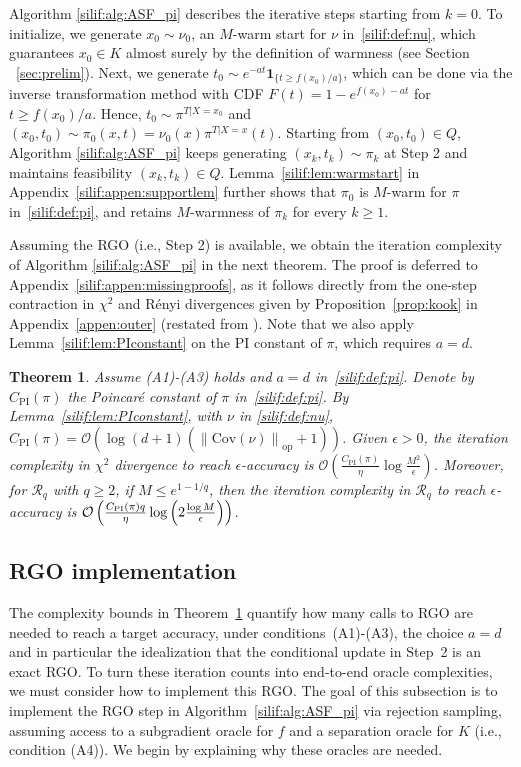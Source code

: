 \documentclass[11pt,letterpaper]{article}
\newcommand{\norm}[1]{\left\lVert #1 \right\rVert}
\newcommand{\cov}[1]{\mathrm{Cov}{\left( #1\right)}}
\newcommand{\opnorm}[1]{\norm{#1}_{\operatorname{op}}}
\newcommand{\brac}[1]{\left( #1\right)}
\newtheorem{theorem}[thm]{Theorem}
\begin{document}
Algorithm \ref{silif:alg:ASF_pi} describes the iterative steps starting from $k = 0$.
To initialize, we generate $x_0\sim \nu_0$, an $M$-warm start for $\nu$ in~\eqref{silif:def:nu}, which guarantees $x_0\in K$ almost surely by the definition of warmness (see Section ~\ref{sec:prelim}). Next, we generate $t_0\sim e^{-at}\mathbf{1}_{\{t\ge f(x_0)/a\}}$, which can be done via the inverse transformation method with CDF $F(t)=1-e^{f(x_0)-at}$ for $t\ge f(x_0)/a$. Hence, $t_0\sim \pi^{T| X=x_0}$ and $(x_0,t_0)\sim \pi_0(x,t) = \nu_0(x) \pi^{T| X=x}(t)$. 
Starting from $(x_0,t_0) \in Q$, Algorithm \ref{silif:alg:ASF_pi} keeps generating $(x_k,t_k)\sim \pi_k$ at Step 2 and maintains feasibility $(x_k,t_k) \in Q$.
Lemma~\ref{silif:lem:warmstart} in Appendix~\ref{silif:appen:supportlem} further shows that $\pi_0$ is $M$-warm for $\pi$ in~\eqref{silif:def:pi}, and retains $M$-warmness of $\pi_k$ for every $k\ge 1$.

Assuming the RGO (i.e., Step 2) is available, we obtain the iteration complexity of Algorithm \ref{silif:alg:ASF_pi} in the next theorem. The proof is  deferred to Appendix~\ref{silif:appen:missingproofs},
as it follows directly from the one-step contraction in $\chi^2$ and R\'enyi divergences given by Proposition~\ref{prop:kook} in Appendix~\ref{appen:outer} (restated from \cite[Lemma~2.9]{kook2025algodiffusion}).
Note that we also apply Lemma~\ref{silif:lem:PIconstant} on the PI constant of $\pi$, which requires $a=d$.


\begin{theorem}\label{silif:theo:outer}
Assume (A1)-(A3) holds and $a=d$ in~\eqref{silif:def:pi}. Denote by $C_{\mathrm{PI}}(\pi)$ the Poincar\'e constant of $\pi$ in~\eqref{silif:def:pi}. By Lemma~\ref{silif:lem:PIconstant}, with $\nu$ in \eqref{silif:def:nu},
$C_{\mathrm{PI}}(\pi)=  \mathcal{O}\brac{\log (d+1)\brac{\opnorm{\cov{\nu}}+1 }}$.
Given $\epsilon>0$, the iteration complexity in $\chi^2$ divergence to reach $\epsilon$-accuracy is
$\mathcal{O} \left(\frac{C_{\mathrm{PI}}(\pi)}{\eta}\log \frac{M^2}{\epsilon}\right)$.
Moreover, for $\mathcal{R}_q$ with $q\ge2$, if $M\le e^{ 1-1/q}$, then the iteration complexity in $\mathcal{R}_q$ to reach $\epsilon$-accuracy is
${\cal O} \left(\frac{C_{\mathrm{PI}}(\pi) q}{\eta}\log \left(2\frac{\log M}{\epsilon}\right)\right)$.
\end{theorem}

\subsection{RGO implementation}\label{subsec:RGO}
The complexity bounds in Theorem~\ref{silif:theo:outer} quantify how many calls to RGO are needed to reach a target accuracy, under conditions~(A1)-(A3), the choice $a=d$ and in particular the idealization that the conditional update in Step~2 is an exact RGO. 
To turn these iteration counts into end-to-end oracle complexities, we must consider how to implement this RGO. The goal of this subsection is to implement the RGO step in Algorithm~\ref{silif:alg:ASF_pi} via rejection sampling, assuming access to a subgradient oracle for $f$ and a separation oracle for $K$ (i.e., condition (A4)). We begin by explaining why these oracles are needed.
\end{document}
